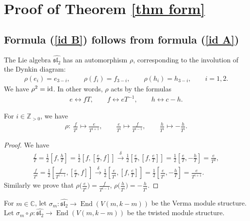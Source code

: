 \section{Proof of Theorem \ref{thm form}}\label{sec PROOF}

\subsection{Formula (\ref{id B}) follows from formula (\ref{id A})}
The Lie algebra $\widehat{{\mathfrak{sl}_2}}$ has an automorphism $\rho$, corresponding to the involution of the Dynkin diagram:
\begin{gather*}
\rho(e_{i})=e_{3-i}, \qquad \rho(f_{i})=f_{3-i}, \qquad \rho(h_{i})=h_{3-i}, \qquad i=1,2.
\end{gather*}
We have $\rho^2={\rm id}$. In other words, $\rho$ acts by the formulas
\begin{gather*}
e\leftrightarrow fT, \qquad f \leftrightarrow e T^{-1}, \qquad h \leftrightarrow c-h.
\end{gather*}

\begin{lem}\label{lem elts}For $i \in \mathbb{Z}_{> 0}$, we have
\begin{gather*}
\rho \colon \ \frac{f}{T^i} \mapsto \frac{e}{T^{i+1}}, \qquad \frac{e}{T^i} \mapsto \frac{f}{T^{i-1}}, \qquad \frac{h}{T^i} \mapsto -\frac{h}{T^i}.
\end{gather*}
\end{lem}
\begin{proof}
We have
\begin{gather*}
\frac{f}{T} = \frac12 \left[f, \frac hT \right] = \frac 12 \left[ f, \left[\frac eT, f \right] \right] \overset{\delta}{\longrightarrow} \frac 12 \left[ \frac eT, \left[f, \frac eT \right] \right] = \frac 12 \left[ \frac eT, - \frac hT \right] = \frac{e}{T^2}, \nonumber \\
\frac{f}{T^i} = \frac 12 \left[ \frac{f}{T^{i-1}}, \left[\frac{e}{T}, f\right] \right] \overset{\delta}{\longrightarrow} \frac 12 \left[ \frac{e}{T^i}, \left[f, \frac eT \right] \right] = \frac 12 \left[ \frac{e}{T^i}, - \frac hT \right] = \frac{e}{T^{i+1}}. \nonumber
\end{gather*}
Similarly we prove that $\rho\big(\frac{e}{T^i}\big) = \frac{f}{T^{i-1}}$, $\rho \big(\frac{h}{T^i}\big) = -\frac{h}{T^i}$.
\end{proof}

For $m\in{\mathbb C}$, let $\sigma_m \colon \widehat{{\mathfrak{sl}_2}} \to \operatorname{End}( V(m,k-m))$ be the Verma module structure. Let $\sigma_m\circ \rho \colon \widehat{{\mathfrak{sl}_2}} \to \operatorname{End}( V(m,k-m))$ be the twisted module structure.

